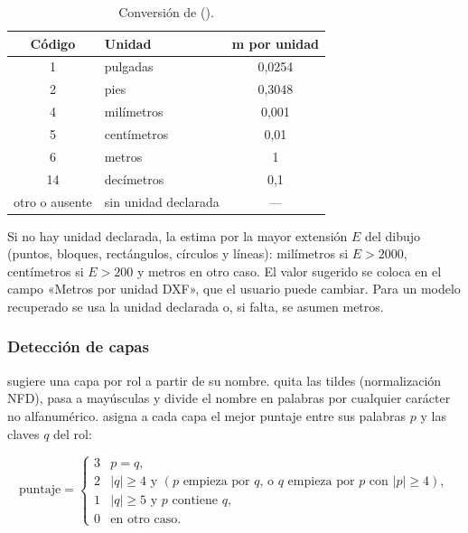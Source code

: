 \begin{table}[H]
	\centering
	\caption{Conversión de  ().}
	\label{tab:mod-dxf-unidades}
	\begin{tabular}{cL{3.6cm}c}
		\hline
		\textbf{Código} & \textbf{Unidad} & \textbf{m por unidad} \\  & pulgadas & 0,0254 \\
		2 & pies & 0,3048 \\
		4 & milímetros & 0,001 \\
		5 & centímetros & 0,01 \\
		6 & metros & 1 \\
		14 & decímetros & 0,1 \\
		otro o ausente & sin unidad declarada & --- \\
		\hline
	\end{tabular}
\end{table}

Si no hay unidad declarada,  la estima por la mayor extensión $E$ del
dibujo (puntos, bloques, rectángulos, círculos y líneas): milímetros si $E > 2000$, centímetros si $E > 200$ y metros en
otro caso. El valor sugerido se coloca en el campo «Metros por unidad DXF», que el usuario puede cambiar. Para un modelo
 recuperado se usa la unidad declarada o, si falta, se asumen metros.

\subsubsection{Detección de capas}

 sugiere una capa por rol a partir de su nombre.  quita las
tildes (normalización NFD), pasa a mayúsculas y divide el nombre en palabras por cualquier carácter no alfanumérico.
 asigna a cada capa el mejor puntaje entre sus palabras $p$ y las claves $q$ del rol:

\begin{equation}
	\text{puntaje} =
	\begin{cases}
		3 & p = q,\\
		2 & \lvert q \rvert \ge 4 \text{ y } \left( p \text{ empieza por } q \text{, o } q \text{ empieza por } p \text{ con } \lvert p \rvert \ge 4 \right),\\
		1 & \lvert q \rvert \ge 5 \text{ y } p \text{ contiene } q,\\
		0 & \text{en otro caso.}
	\end{cases}
\end{equation}

